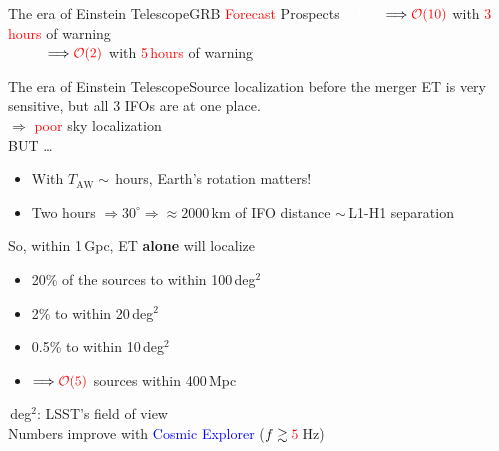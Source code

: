 \documentclass[xcolor=dvipsnames,handout,t]{beamer}
\newcommand{\red}[1]{\textcolor{red}{#1}}
\newcommand{\bl}[1]{\textcolor{blue}{#1}}
\newcommand{\ord}{\mathcal{O}}
\begin{document}
\begin{frame}{The era of Einstein Telescope}{GRB \red{Forecast} Prospects}
  \vspace{1mm}
  \textcolor{white}{ET-C} $\Longrightarrow \red{\ord(10)}$ with \red{3\,hours} of warning \\
  \vspace{1mm}
  \textcolor{white}{ET-C} $\Longrightarrow \red{\ord(2)}$ with \red{5\,hours} of warning
\end{frame}

\begin{frame}{The era of Einstein Telescope}{Source localization before the merger} 
  ET is very sensitive, but all 3 IFOs are at one place. \\
  \vspace{1mm}
  $\Longrightarrow$ \red{poor} sky localization \\
  \vspace{1mm}
  BUT \ldots \\
  \begin{itemize}
  \item With $T_\text{AW} \sim\,$hours, Earth's rotation matters!
  \item Two hours $\Rightarrow 30^\circ \Rightarrow \approx 2000\,$km of IFO distance $\sim\,$L1-H1 separation
  \end{itemize}
  So, within 1\,Gpc, ET {\bf alone} will localize
  \begin{itemize}
  \item 20\% of the sources to within 100\,deg$^2$
  \item 2\% to within 20\,deg$^2$
  \item 0.5\% to within 10\,deg$^2$ 
  \item[]$\Longrightarrow \red{\ord(5)}$ sources within 400\,Mpc
  \end{itemize}
  \,deg$^2$: LSST's field of view\\
   Numbers improve with \bl{Cosmic Explorer} ($f\gtrsim \red{5}\,$Hz)
\end{frame}
\end{document}
